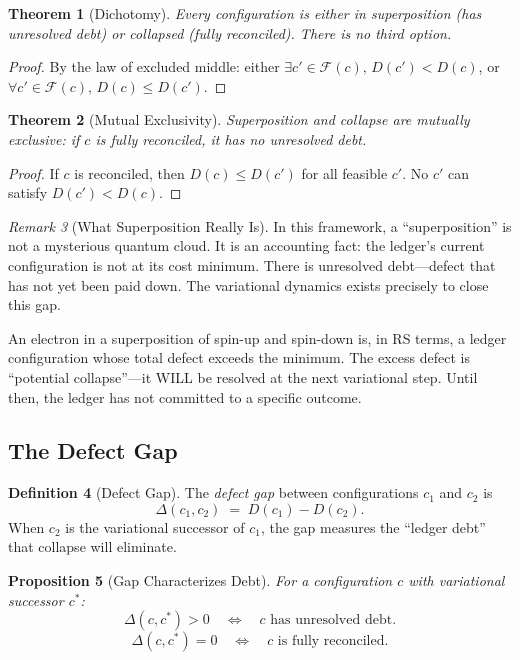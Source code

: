 \documentclass[11pt,a4paper]{article}
\theoremstyle{plain}
\newtheorem{theorem}{Theorem}[section]
\newtheorem{proposition}[theorem]{Proposition}
\theoremstyle{definition}
\newtheorem{definition}[theorem]{Definition}
\theoremstyle{remark}
\newtheorem{remark}[theorem]{Remark}
\newcommand{\F}{\mathcal{F}}
\begin{document}
\begin{theorem}[Dichotomy]\label{thm:dichotomy}
Every configuration is either in superposition (has unresolved debt) or collapsed (fully reconciled).
There is no third option.
\end{theorem}

\begin{proof}
By the law of excluded middle: either $\exists c' \in \F(c),\, D(c') < D(c)$, or $\forall c' \in \F(c),\, D(c) \le D(c')$.
\end{proof}

\begin{theorem}[Mutual Exclusivity]\label{thm:mutual}
Superposition and collapse are mutually exclusive: if $c$ is fully reconciled, it has no unresolved debt.
\end{theorem}

\begin{proof}
If $c$ is reconciled, then $D(c) \le D(c')$ for all feasible $c'$.
No $c'$ can satisfy $D(c') < D(c)$.
\end{proof}

\begin{remark}[What Superposition Really Is]
In this framework, a ``superposition'' is not a mysterious quantum cloud.
It is an accounting fact: the ledger's current configuration is not at its cost minimum.
There is unresolved debt---defect that has not yet been paid down.
The variational dynamics exists precisely to close this gap.

An electron in a superposition of spin-up and spin-down is, in RS terms, a ledger configuration whose total defect exceeds the minimum.
The excess defect is ``potential collapse''---it WILL be resolved at the next variational step.
Until then, the ledger has not committed to a specific outcome.
\end{remark}

\subsection{The Defect Gap}

\begin{definition}[Defect Gap]\label{def:gap}
The \emph{defect gap} between configurations $c_1$ and $c_2$ is
\[
\Delta(c_1, c_2) \;=\; D(c_1) - D(c_2).
\]
When $c_2$ is the variational successor of $c_1$, the gap measures the ``ledger debt'' that collapse will eliminate.
\end{definition}

\begin{proposition}[Gap Characterizes Debt]\label{prop:gap}
For a configuration $c$ with variational successor $c^*$:
\[
\Delta(c, c^*) > 0 \quad\Longleftrightarrow\quad c \text{ has unresolved debt}.
\]
\[
\Delta(c, c^*) = 0 \quad\Longleftrightarrow\quad c \text{ is fully reconciled}.
\]
\end{proposition}
\end{document}
